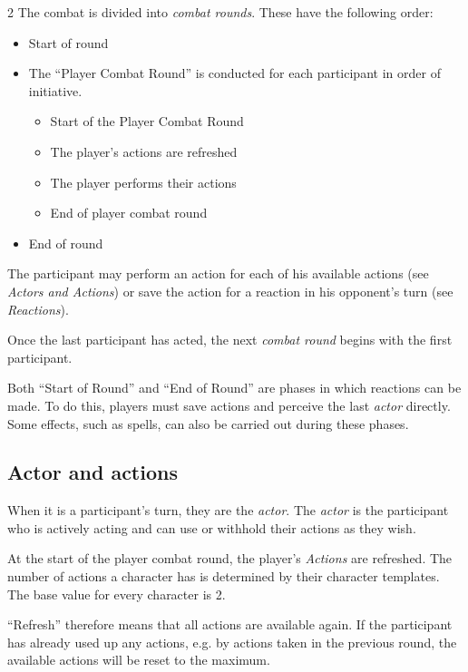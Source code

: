 \begin{multicols}{2}
The combat is divided into \textit{combat rounds}. These have the following order:
\begin{itemize}
    \item Start of round
    \item The ``Player Combat Round'' is conducted for each participant in order of initiative.
        \begin{itemize}
            \item Start of the Player Combat Round
            \item The player's actions are refreshed
            \item The player performs their actions
            \item End of player combat round
        \end{itemize}
    \item End of round
\end{itemize}

The participant may perform an action for each of his available actions (see \textit{Actors and Actions}) or save the action for a reaction in his opponent's turn (see \textit{Reactions}).

Once the last participant has acted, the next \textit{combat round} begins with the first participant.

Both ``Start of Round'' and ``End of Round'' are phases in which reactions can be made. To do this, players must save actions and perceive the last \textit{actor} directly. Some effects, such as spells, can also be carried out during these phases.

\subsection{Actor and actions}

When it is a participant's turn, they are the \textit{actor}. The \textit{actor} is the participant who is actively acting and can use or withhold their actions as they wish.

At the start of the player combat round, the player's \textit{Actions} are refreshed. The number of actions a character has is determined by their character templates. The base value for every character is 2.

``Refresh'' therefore means that all actions are available again. If the participant has already used up any actions, e.g. by actions taken in the previous round, the available actions will be reset to the maximum.


\end{multicols}
